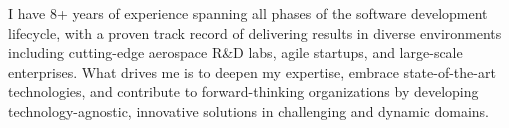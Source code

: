 
\begin{cvparagraph}
I have 8+ years of experience spanning all phases of the software development lifecycle, with a proven track record of delivering results in diverse environments including cutting-edge aerospace R\&D labs, agile startups, and large-scale enterprises. What drives me is to deepen my expertise, embrace state-of-the-art technologies, and contribute to forward-thinking organizations by developing technology-agnostic, innovative solutions in challenging and dynamic domains.
\end{cvparagraph}
